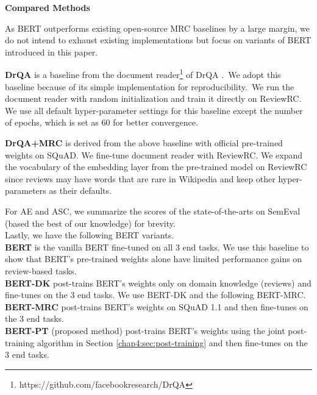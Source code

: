 \begin{table}[H]
    \centering
    \caption{Statistics of ReviewRC Dataset}
\label{chap6:tbl:rrc}
\end{table}


\textbf{Compared Methods}

As BERT outperforms existing open-source MRC baselines by a large margin, we do not intend to exhaust existing implementations but focus on variants of BERT introduced in this paper.

\textbf{DrQA} is a baseline from the document reader\footnote{https://github.com/facebookresearch/DrQA} of DrQA \cite{chen2017reading}.~We adopt this baseline because of its simple implementation for reproducibility.~We run the document reader with random initialization and train it directly on ReviewRC.
We use all default hyper-parameter settings for this baseline except the number of epochs, which is set as 60 for better convergence.

\textbf{DrQA+MRC} is derived from the above baseline with official pre-trained weights on SQuAD.
We fine-tune document reader with ReviewRC. We expand the vocabulary of the embedding layer from the pre-trained model on ReviewRC since reviews may have words that are rare in Wikipedia and keep other hyper-parameters as their defaults.

For AE and ASC, we summarize the scores of the state-of-the-arts on SemEval (based the best of our knowledge) for brevity.\\

Lastly, we have the following BERT variants.\\
\textbf{BERT} is the vanilla BERT fine-tuned on all 3 end tasks. We use this baseline to show that BERT's pre-trained weights alone have limited performance gains on review-based tasks.\\
\textbf{BERT-DK} post-trains BERT's weights only on domain knowledge (reviews) and fine-tunes on the 3 end tasks. We use BERT-DK and the following BERT-MRC.\\
\textbf{BERT-MRC} post-trains BERT's weights on SQuAD 1.1 and then fine-tunes on the 3 end tasks.\\
\textbf{BERT-PT} (proposed method) post-trains BERT's weights using the joint post-training algorithm in Section \ref{chap4:sec:post-training} and then fine-tunes on the 3 end tasks.


